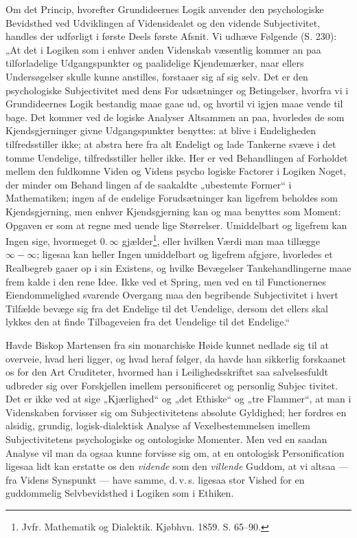 \documentclass[12pt]{book}
\newcommand{\opage}[1]{\marginnote{\footnotesize\textit{[#1]}}}
\begin{document}
Om det Princip, hvorefter Grundideernes Logik anvender
den psychologiske Bevidsthed ved Udviklingen af Vidensidealet
\opage{125}\setcounter{footnote}{0}%
og den vidende Subjectivitet, handles der udførligt i første
Deels første Afsnit. Vi udhæve Følgende (S. 230): „At
det i Logiken som i enhver anden Videnskab væsentlig kommer an
paa tilforladelige Udgangspunkter og paalidelige Kjendemærker,
naar ellers Undersøgelser skulle kunne anstilles, forstaaer sig af
sig selv. Det er den psychologiske Subjectivitet med dens For\-%
udsætninger og Betingelser, hvorfra vi i Grundideernes Logik
bestandig maae gaae ud, og hvortil vi igjen maae vende til\-%
bage. Det kommer ved de logiske Analyser Altsammen an
paa, hvorledes de som Kjendsgjerninger givne Udgangspunkter
benyttes: at blive i Endeligheden tilfredsstiller ikke; at abstra\-%
here fra alt Endeligt og lade Tankerne svæve i det tomme
Uendelige, tilfredsstiller heller ikke. Her er ved Behandlingen
af Forholdet mellem den fuldkomne Viden og Videns psycho\-%
logiske Factorer i Logiken Noget, der minder om Behand\-%
lingen af de saakaldte „ubestemte Former“ i Mathematiken;
ingen af de endelige Forudsætninger kan ligefrem beholdes
som Kjendsgjerning, men enhver Kjendsgjerning kan og maa
benyttes som Moment: Opgaven er som at regne med uende\-%
lige Størrelser. Umiddelbart og ligefrem kan Ingen sige,
hvormeget 0.\,$\infty$ gjælder\footnote{Jvfr. Mathematik og Dialektik. Kjøbhvn. 1859. S. 65--90.}, eller hvilken Værdi man maa
tillægge $\infty-\infty$; ligesaa kan heller Ingen umiddelbart og
ligefrem afgjøre, hvorledes et Realbegreb gaaer op i sin
Existens, og hvilke Bevægelser Tankehandlingerne maae frem\-%
kalde i den rene Idee. Ikke ved et Spring, men ved en til
Functionernes Eiendommelighed svarende Overgang maa den
begribende Subjectivitet i hvert Tilfælde bevæge sig fra det
Endelige til det Uendelige, dersom det ellers skal lykkes den at
finde Tilbageveien fra det Uendelige til det Endelige.“

Havde Biskop Martensen fra sin monarchiske Høide kunnet
nedlade sig til at overveie, hvad heri ligger, og hvad heraf
følger, da havde han sikkerlig forskaanet os for den Art Cruditeter,
\opage{126}\setcounter{footnote}{0}%
hvormed han i Leilighedsskriftet saa salvelsesfuldt udbreder sig
over Forskjellen imellem personificeret og personlig Subjec\-%
tivitet. Det er ikke ved at sige „Kjærlighed“ og „det Ethiske“
og „tre Flammer“, at man i Videnskaben forvisser sig om
Subjectivitetens absolute Gyldighed; her fordres en alsidig,
grundig, logisk-dialektisk Analyse af Vexelbestemmelsen imellem
Subjectivitetens psychologiske og ontologiske Momenter. Men
ved en saadan Analyse vil man da ogsaa kunne forvisse sig
om, at en ontologisk Personification ligesaa lidt kan erstatte
os den \emph{vidende} som den \emph{villende} Guddom, at vi altsaa
--- fra Videns Synspunkt --- have samme, d.\,v.\,s. ligesaa
stor Vished for en guddommelig Selvbevidsthed i Logiken
som i Ethiken.
\end{document}
